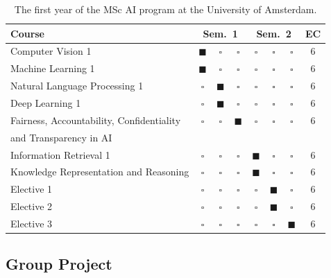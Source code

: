 \documentclass[letterpaper]{article}
\newcommand{\OurUniversity}{the University of Amsterdam}
\begin{document}
\begin{table}[t]
\caption{The first year of the MSc AI program at \OurUniversity{}.}
\label{tab:msc_program}
\centering
\footnotesize
\setlength{\tabcolsep}{3pt}
\begin{tabular}{l c@{~}c@{~}c c@{~}c@{~}c c}
\toprule
Course & \multicolumn{3}{c}{Sem.\ 1} & \multicolumn{3}{c}{Sem.\ 2} & EC \\
\midrule
     Computer Vision 1 & $\blacksquare$ & $\square$ & $\square$ & $\square$ & $\square$ & $\square$ & 6 \\
     Machine Learning 1 & $\blacksquare$ & $\square$ & $\square$ & $\square$ & $\square$ & $\square$ & 6 \\
     Natural Language Processing 1 & $\square$ & $\blacksquare$ & $\square$ & $\square$ & $\square$ & $\square$ & 6 \\
     Deep Learning 1 & $\square$ & $\blacksquare$ & $\square$ & $\square$ & $\square$ & $\square$ & 6\\
     Fairness, Accountability, Confidentiality  & $\square$ & $\square$ & $\blacksquare$ & $\square$ & $\square$ & $\square$ & 6 \\
     and Transparency in AI \\
     Information Retrieval 1 & $\square$ & $\square$ & $\square$ & $\blacksquare$ & $\square$ & $\square$ & 6 \\
     Knowledge Representation and Reasoning & $\square$ & $\square$ & $\square$ & $\blacksquare$ & $\square$ & $\square$ & 6 \\
     Elective 1 & $\square$ & $\square$ & $\square$ & $\square$ & $\blacksquare$ & $\square$ & 6 \\
     Elective 2 & $\square$ & $\square$ & $\square$ & $\square$ & $\blacksquare$ & $\square$ & 6 \\
     Elective 3 & $\square$ & $\square$ & $\square$ & $\square$ & $\square$ & $\blacksquare$ & 6 \\
\bottomrule
\end{tabular}
\end{table}

\subsection{Group Project}
\label{section:assignment}
\end{document}
